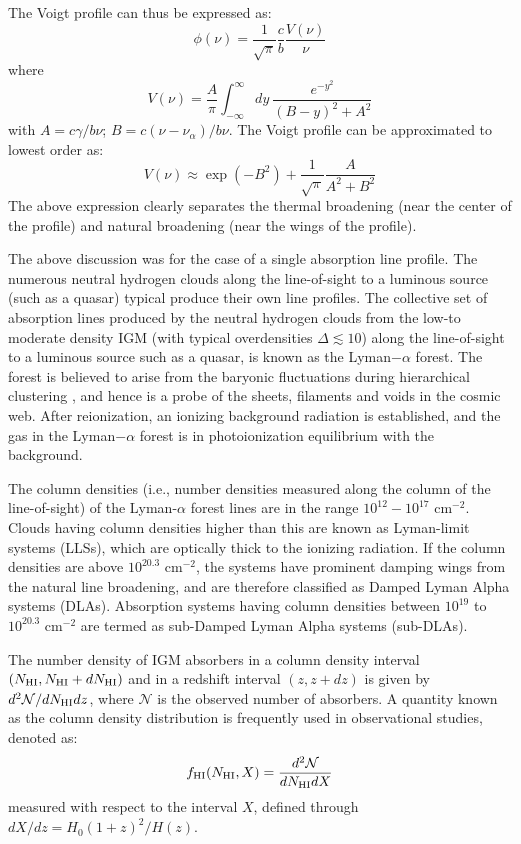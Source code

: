 The Voigt profile can thus be expressed as:
\begin{equation}
 \phi(\nu) = \frac{1}{\sqrt{\pi}} \frac{c}{b} \frac{V(\nu)}{\nu}
\end{equation}
where
\begin{equation}
V(\nu)  = \frac{A}{\pi}  \int_{-\infty}^{\infty} dy \ \frac{e^{-y^2}}{(B - y)^2 + A^2} 
\end{equation}
with $A = c\gamma/b \nu$; $B = c(\nu - \nu_{\alpha})/b \nu$.
The Voigt profile can be approximated to lowest order as:
\begin{equation}
 V(\nu) \approx \exp(-B^2) + \frac{1}{\sqrt{\pi}} \frac{A}{A^2 + B^2}
\end{equation} 
The above expression clearly separates the thermal broadening (near the center of the profile) and natural broadening (near the wings of the profile). 

The above discussion was for the case of a single absorption line profile. The numerous neutral hydrogen clouds along the line-of-sight to a luminous source (such as a quasar) typical produce their own line profiles.
The collective set of absorption lines produced by the neutral hydrogen clouds from the low-to moderate density IGM (with typical overdensities $\Delta \lesssim 10$) along the line-of-sight to a luminous source such as a quasar,  is known as the Lyman$-\alpha$ forest. 
The forest is believed to arise from the baryonic fluctuations during hierarchical clustering \cite{cen, zhang, miralda, hernquist}, and hence is a probe of the sheets, filaments and voids in the cosmic web. After reionization, an ionizing  background radiation is established, and the gas in the Lyman$-\alpha$ forest is in photoionization equilibrium with the background. 

The column densities (i.e., number densities measured along the column of the line-of-sight) of the Lyman-$\alpha$ forest lines are in the range $10^{12} - 10^{17}$ cm$^{-2}$. 
Clouds having column densities higher than this are known as Lyman-limit systems (LLSs), which are optically thick to the ionizing radiation.  If the column densities are above $10^{20.3}$ cm$^{-2}$, the systems have prominent damping wings from the natural line broadening, and are therefore classified as Damped Lyman Alpha systems (DLAs). Absorption systems having column densities between $10^{19}$ to $10^{20.3}$ cm$^{-2}$ are termed as sub-Damped Lyman Alpha systems (sub-DLAs).

The number density of IGM absorbers in a column density interval $(N_{\rm HI}, N_{\rm HI} + d N_{\rm HI})$ and in a redshift interval $(z, z+dz)$ is given by  ${d^2 \mathcal{N}/d N_{\rm HI} dz}$, where $\mathcal{N}$ is the observed number of absorbers. A quantity known as the column density distribution is frequently used in observational studies, denoted as:
\begin{equation}
 f_{\rm HI} (N_{\rm HI}, X) = \frac{d^2 \mathcal{N}}{d N_{\rm HI} dX} 
 \label{coldens}
\end{equation} 
measured with respect to the interval $X$, defined through $dX/dz = H_0 (1+z)^2/H(z)$. 




